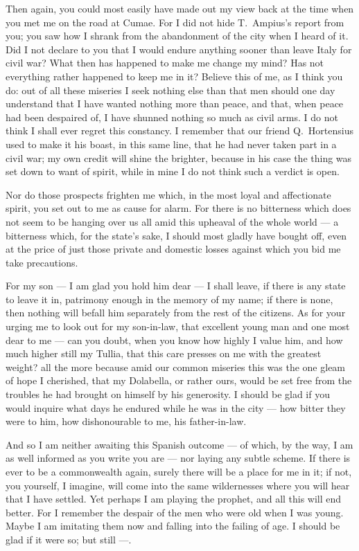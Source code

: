  Then again, you could most easily have made out my view back at the time when you met me on the road at Cumae. For I did not hide T.\ Ampius's report from you; you saw how I shrank from the abandonment of the city when I heard of it. Did I not declare to you that I would endure anything sooner than leave Italy for civil war? What then has happened to make me change my mind? Has not everything rather happened to keep me in it? Believe this of me, as I think you do: out of all these miseries I seek nothing else than that men should one day understand that I have wanted nothing more than peace, and that, when peace had been despaired of, I have shunned nothing so much as civil arms. I do not think I shall ever regret this constancy. I remember that our friend Q.\ Hortensius used to make it his boast, in this same line, that he had never taken part in a civil war; my own credit will shine the brighter, because in his case the thing was set down to want of spirit, while in mine I do not think such a verdict is open.

 Nor do those prospects frighten me which, in the most loyal and affectionate spirit, you set out to me as cause for alarm. For there is no bitterness which does not seem to be hanging over us all amid this upheaval of the whole world --- a bitterness which, for the state's sake, I should most gladly have bought off, even at the price of just those private and domestic losses against which you bid me take precautions.

 For my son --- I am glad you hold him dear --- I shall leave, if there is any state to leave it in, patrimony enough in the memory of my name; if there is none, then nothing will befall him separately from the rest of the citizens. As for your urging me to look out for my son-in-law, that excellent young man and one most dear to me --- can you doubt, when you know how highly I value him, and how much higher still my Tullia, that this care presses on me with the greatest weight? all the more because amid our common miseries this was the one gleam of hope I cherished, that my Dolabella, or rather ours, would be set free from the troubles he had brought on himself by his generosity. I should be glad if you would inquire what days he endured while he was in the city --- how bitter they were to him, how dishonourable to me, his father-in-law.

 And so I am neither awaiting this Spanish outcome --- of which, by the way, I am as well informed as you write you are --- nor laying any subtle scheme. If there is ever to be a commonwealth again, surely there will be a place for me in it; if not, you yourself, I imagine, will come into the same wildernesses where you will hear that I have settled. Yet perhaps I am playing the prophet, and all this will end better. For I remember the despair of the men who were old when I was young. Maybe I am imitating them now and falling into the failing of age. I should be glad if it were so; but still ---.

